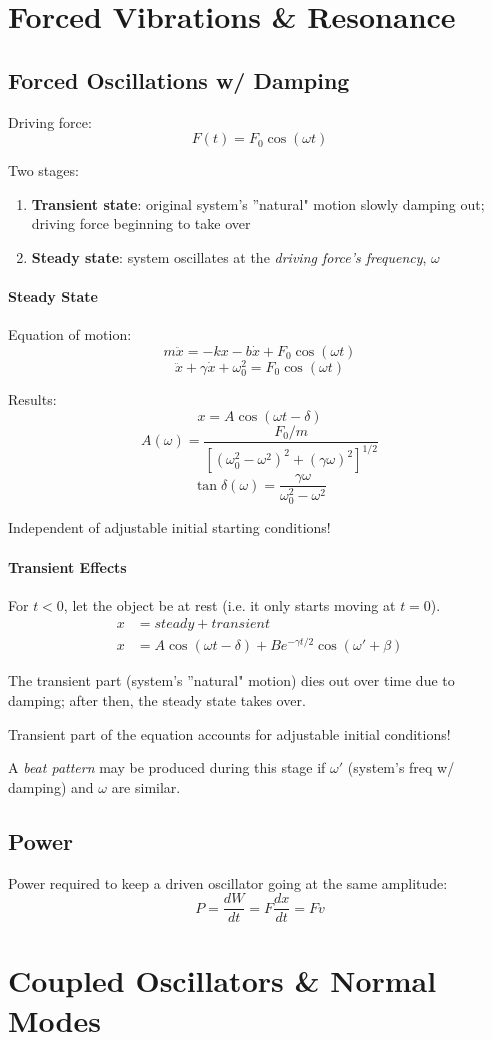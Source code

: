 \documentclass[11pt,letterpaper,titlepage,oneside]{book}
\begin{document}
\chapter{Forced Vibrations \& Resonance}
\section{Forced Oscillations w/ Damping}
Driving force:
\[ F(t) = F_0 \cos(\omega t) \]

Two stages:
\begin{enumerate}
\item \textbf{Transient state}: original system's ''natural" motion slowly damping out; driving force beginning to take over
\item \textbf{Steady state}: system oscillates at the \emph{driving force's frequency}, $\omega$
\end{enumerate}

\subsubsection{Steady State}

Equation of motion:
\[ m\ddot{x} = -kx - b\dot{x} + F_0 \cos(\omega t) \]
\[ \ddot{x} + \gamma\dot{x} + \omega_0^2 = F_0 \cos(\omega t) \]

Results: 
\[ x = A \cos (\omega t - \delta) \]
\[ A(\omega) = \frac{F_0/m}{[(\omega_0^2 - \omega^2)^2 + (\gamma\omega)^2]^{1/2}} \]
\[ \tan \delta (\omega) = \frac{\gamma\omega}{\omega_0^2 - \omega^2}\]

Independent of adjustable initial starting conditions!

\subsubsection{Transient Effects}
For $t<0$, let the object be at rest (i.e. it only starts moving at $t=0$).
\begin{align*}
x &= steady + transient \\
x &= A \cos (\omega t - \delta) + B e^{-\gamma t/2} \cos(\omega' + \beta)
\end{align*}

The transient part (system's ''natural" motion) dies out over time due to damping; after then, the steady state takes over. 

Transient part of the equation accounts for adjustable initial conditions!

A \emph{beat pattern} may be produced during this stage if $\omega'$ (system's freq w/ damping) and $\omega$ are similar.

\section{Power}
Power required to keep a driven oscillator going at the same amplitude:
\[ P = \frac{dW}{dt} = F\frac{dx}{dt} = Fv \]

\chapter{Coupled Oscillators \& Normal Modes}
\end{document}
